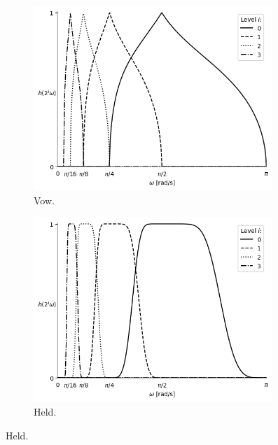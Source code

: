 \begin{figure}[H]
  \centering
  \begin{subfigure}[t]{.49\textwidth}
    \centering
    \includegraphics[width=0.99\textwidth]{Figures/chapter-wavelets/figures/profileMotherWavelet_Vow_5_Mother.png}
    \captionsetup{width=\textwidth}
    \caption{Vow.}
    \label{fig:mother_vow}
  \end{subfigure}
  \begin{subfigure}[t]{.49\textwidth}
    \centering
    \includegraphics[width=0.99\textwidth]{Figures/chapter-wavelets/figures/profileMotherWavelet_Held_5_Mother.png}
    \captionsetup{width=\textwidth}
    \caption{Held.}
    \label{fig:mother_held}

\end{subfigure}
\end{figure}
